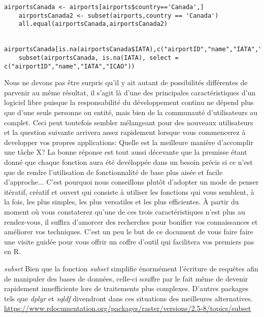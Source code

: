 \begin{lstlisting}[caption = Filtrer les données,label=src:Filter]
	airportsCanada <- airports[airports$country=='Canada',]
	airportsCanada2 <- subset(airports,country == 'Canada')
	all.equal(airportsCanada,airportsCanada2)

	airportsCanada[is.na(airportsCanada$IATA),c("airportID","name","IATA","ICAO")]
	subset(airportsCanada, is.na(IATA), select = c("airportID","name","IATA","ICAO"))
\end{lstlisting}

\vspace{\baselineskip}
\noindent
Nous ne devons pas être surpris qu'il y ait autant de possibilités différentes de parvenir au même résultat, il s'agit là d'une des principales caractéristiques d'un logiciel libre puisque la responsabilité du développement continu ne dépend plus que d'une seule personne ou entité, mais bien de la communauté d'utilisateurs au complet. Ceci peut toutefois sembler mélangeant pour des nouveaux utilisateurs et la question suivante arrivera assez rapidement lorsque vous commencerez à developper vos propres applications: Quelle est la meilleure manière d'accomplir une tâche X? La bonne réponse est tout aussi décevante que la premisse étant donné que chaque fonction aura été devéloppée dans un besoin précis si ce n'est que de rendre l'utilisation de fonctionnalité de base plus aisée et facile d'approche... C'est pourquoi nous conseillons plutôt d'adopter un mode de penser itératif, créatif et ouvert qui consiste à utiliser les fonctions qui vous semblent, à la fois, les plus simples, les plus versatiles et les plus efficientes. À partir du moment où vous constaterez qu'une de ces trois caractéristiques n'est plus au rendez-vous, il suffira d'amorcer des recherches pour bonifier vos connaissances et améliorer vos techniques. C'est un peu le but de ce document de vous faire faire une visite guidée pour vous offrir un coffre d'outil qui facilitera vos premiers pas en R. \\

\begin{moreInfo}{\emph{subset}}
	Bien que la fonction \emph{subset} simplifie énormément l'écriture de requêtes afin de manipuler des bases de données, celle-ci souffre par le fait même de devenir rapidement innefficiente lors de traitements plus complexes. D'autres packages tels que \emph{dplyr} et \emph{sqldf} divendront dans ces situations des meilleures alternatives. \\
	\url{https://www.rdocumentation.org/packages/raster/versions/2.5-8/topics/subset}
\end{moreInfo}

